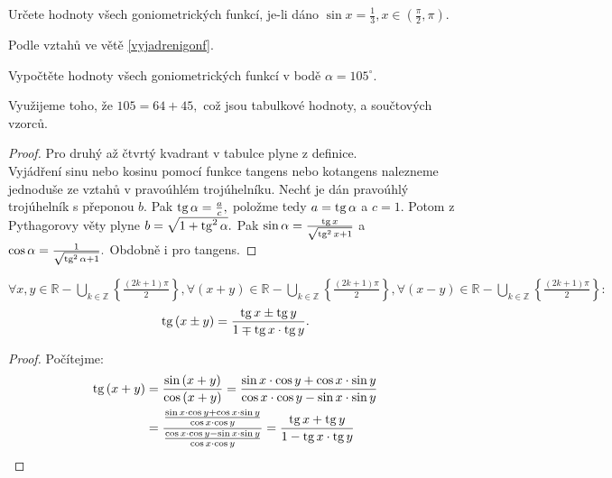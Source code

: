 \begin{priklad}
Určete hodnoty všech goniometrických funkcí, je-li dáno $\sin x=\frac{1}{3}, x \in \left ( \frac{\pi}{2},\pi \right ). $
\end{priklad}

\begin{reseni}
Podle vztahů ve větě \ref{vyjadrenigonf}.
\end{reseni}

\begin{priklad}
Vypočtěte hodnoty všech goniometrických funkcí v bodě $\alpha = 105^\circ$.
\end{priklad}

\begin{reseni}
Využijeme toho, že $105=64+45,$ což jsou tabulkové hodnoty, a součtových vzorců.
\end{reseni}

\begin{proof}
    Pro druhý až čtvrtý kvadrant v tabulce plyne z definice. \\
    Vyjádření sinu nebo kosinu pomocí funkce tangens nebo kotangens nalezneme
    jednoduše ze vztahů v pravoúhlém trojúhelníku. Nechť je dán pravoúhlý trojúhelník
    s přeponou $b.$ Pak $\operatorname{tg} \alpha = \frac{a}{c},$ položme tedy $a = \operatorname{tg} \alpha$ a $c=1. $
    Potom z Pythagorovy věty plyne $b=\sqrt{1+\operatorname{tg}^2 \alpha}. $ Pak $\sin\alpha = \frac{\operatorname{tg} x}{\sqrt{\operatorname{tg}^2 x+1} }$ a
    $\cos \alpha = \frac{1}{\sqrt{\operatorname{tg}^2 \alpha + 1} }.$ Obdobně i pro tangens.
\end{proof}

\begin{veta}
  $\forall x,y\in\mathbb{R}-\bigcup\limits_{k\in\mathbb{Z}} \left\{\frac{(2k+1)\pi}{2}\right\}, \forall (x+y) \in \mathbb{R}-\bigcup\limits_{k\in\mathbb{Z}} \left\{\frac{(2k+1)\pi}{2}\right\}, \forall (x-y) \in \mathbb{R}-\bigcup\limits_{k\in\mathbb{Z}} \left\{\frac{(2k+1)\pi}{2}\right\}:$
  $$\operatorname{tg}\left(x\pm y\right) = \frac{\operatorname{tg} x \pm \operatorname{tg} y}{1\mp\operatorname{tg} x \cdot \operatorname{tg} y}.$$
\end{veta}
\begin{proof}
    Počítejme:
    \begin{align*}
        \operatorname{tg} \left(x+y\right) & = \frac{\sin \left(x+y\right)}{\cos \left(x+y\right)}=\frac{\sin x\cdot  \cos y + \cos x\cdot  \sin y}{\cos x \cdot \cos y - \sin x\cdot  \sin y} \\
        & = \frac{\frac{\sin x \cdot \cos y + \cos x\cdot  \sin y}{\cos x \cdot \cos y}}{\frac{\cos x\cdot  \cos y - \sin x \cdot \sin y}{\cos x\cdot  \cos y}}=\frac{\operatorname{tg} x + \operatorname{tg} y}{1-\operatorname{tg} x \cdot \operatorname{tg} y}\qedhere
    \end{align*}
\end{proof}



